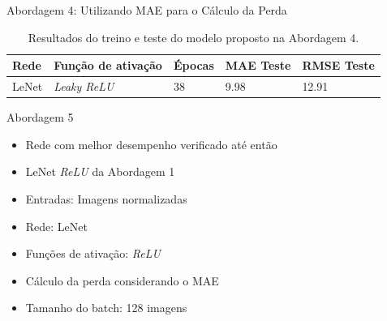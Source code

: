 \begin{frame}{Abordagem 4: Utilizando MAE para o Cálculo da Perda}
  \begin{table}[!ht]
		\caption{Resultados do treino e teste do modelo proposto na Abordagem 4.}
		\label{tab:results-1}
		\begin{center}
			\begin{tabular}{l l l l l}
				\toprule
				Rede & Função de ativação & Épocas & MAE Teste & RMSE Teste \\
				\midrule
        LeNet & \emph{Leaky ReLU} & 38 & 9.98 & 12.91 \\
				\bottomrule
			\end{tabular}
		\end{center}
	\end{table}
\end{frame}



\begin{frame}{Abordagem 5}
 \begin{itemize}
   \item Rede com melhor desempenho verificado até então
   \item  \alert{LeNet \emph{ReLU} da Abordagem 1}
   \ \ \newline
   \item Entradas: \alert{Imagens normalizadas}
   \item Rede: LeNet
   \item Funções de ativação: \emph{ReLU}
   \ \ \newline
   \item Cálculo da perda considerando o MAE
   \item Tamanho do batch: 128 imagens
   \end{itemize}
\end{frame}

